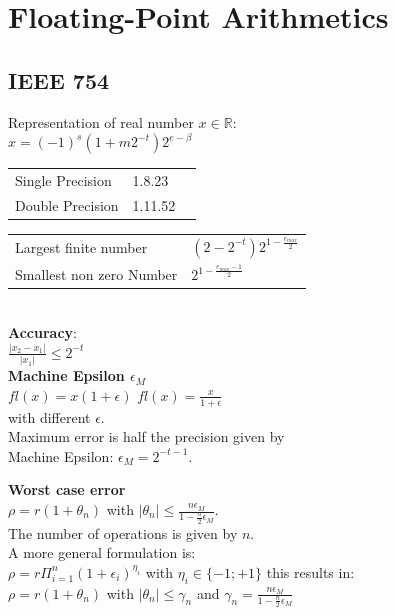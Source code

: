\documentclass[english]{latex4ei/latex4ei_sheet}
\begin{document}
\section{Floating-Point Arithmetics}


\begin{sectionbox}
	\subsection{IEEE 754}
	Representation of real number $x\in\mathbb{R}$:\\
	
	$x = (-1)^s(1+m2^{-t})2^{e-\beta}$\\

\begin{tabular}{lll}
	Single Precision & 1.8.23 \\
	Double Precision & 1.11.52 \\
\end{tabular}

\begin{tabular}{ll}
Largest finite number & $(2-2^{-t})2^{1-\frac{e_{max}}{2}}$\\
Smallest non zero Number & $2^{1-\frac{e_{max}-1}{2}}$
\end{tabular}\\

\textbf{Accuracy}:\\

$\frac{\left|x_2 - x_1\right|}{\left|x_1\right|} \leq 2^{-t}$\\

\textbf{Machine Epsilon $\epsilon_M$}\\

$\textit{fl}(x) = x(1+\epsilon)$ \hfil $\textit{fl}(x) = \frac{x}{1+\epsilon}$\\
with different $\epsilon$.\\

Maximum error is half the precision given by \\
Machine Epsilon: $\epsilon_M = 2^{-t-1}$.

\textbf{Worst case error}\\
$\rho = r(1+\theta_n)$ with $|\theta_n| \leq \frac{n\epsilon_M}{1-\frac{n}{2}\epsilon_M}$.\\
The number of operations is given by $n$.\\

A more general formulation is:\\
$\rho = r\Pi_{i=1}^{n} (1+\epsilon_i)^{\eta_i}$ with $\eta_i \in \{-1;+1\}$ this results in:\\
$\rho=r(1+\theta_n)$ with $|\theta_n| \leq \gamma_n$ and $\gamma_n = \frac{n\epsilon_M}{1-\frac{n}{2}\epsilon_M}$


\end{sectionbox}
\end{document}
